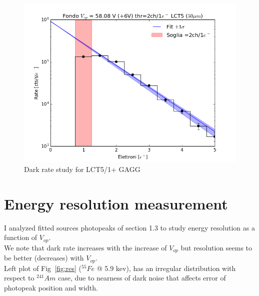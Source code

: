 \documentclass[10pt,a4paper, openany]{book}
\begin{document}
\begin{figure}[!h]
\begin{center}
\includegraphics[scale=0.26]{imm/fit6_2.png}
\end{center}
\caption{Dark rate study for LCT5/1+ GAGG} 
\label{fig:noise}
\end{figure}

\newpage

\section{Energy resolution measurement}
I analyzed fitted sources photopeaks of section 1.3 to study energy resolution as a function of $V_{op}$.\\
We note that dark rate increases with the increase of $V_{op}$ but resolution seems to be better (decreases) with $V_{op}$.\\
Left plot of Fig~\ref{fig:res} ($^{55}Fe$ @ 5.9 kev), has an irregular distribution with respect to $^{241}Am$ case, due to nearness of dark noise that affects error of photopeak position and width. 
\end{document}
